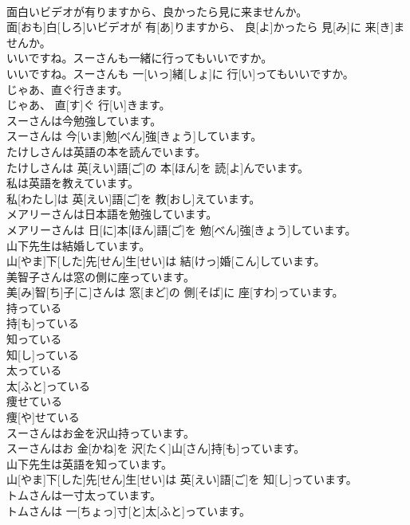 \documentclass[8pt]{extreport}
\begin{document}
\begin{CJK}{UTF8}{min}
\\	面白いビデオが有りますから、良かったら見に来ませんか。	
\\	面[おも]白[しろ]いビデオが 有[あ]りますから、 良[よ]かったら 見[み]に 来[き]ませんか。
\\	いいですね。スーさんも一緒に行ってもいいですか。	
\\	いいですね。スーさんも 一[いっ]緒[しょ]に 行[い]ってもいいですか。
\\	じゃあ、直ぐ行きます。	
\\	じゃあ、 直[す]ぐ 行[い]きます。
\\	スーさんは今勉強しています。	
\\	スーさんは 今[いま]勉[べん]強[きょう]しています。
\\	たけしさんは英語の本を読んでいます。	
\\	たけしさんは 英[えい]語[ご]の 本[ほん]を 読[よ]んでいます。
\\	私は英語を教えています。	
\\	私[わたし]は 英[えい]語[ご]を 教[おし]えています。
\\	メアリーさんは日本語を勉強しています。	
\\	メアリーさんは 日[に]本[ほん]語[ご]を 勉[べん]強[きょう]しています。
\\	山下先生は結婚しています。	
\\	山[やま]下[した]先[せん]生[せい]は 結[けっ]婚[こん]しています。
\\	美智子さんは窓の側に座っています。	
\\	美[み]智[ち]子[こ]さんは 窓[まど]の 側[そば]に 座[すわ]っています。
\\	持っている	
\\	持[も]っている
\\	知っている	
\\	知[し]っている
\\	太っている	
\\	太[ふと]っている
\\	痩せている	
\\	痩[や]せている	
\\	スーさんはお金を沢山持っています。	
\\	スーさんはお 金[かね]を 沢[たく]山[さん]持[も]っています。
\\	山下先生は英語を知っています。	
\\	山[やま]下[した]先[せん]生[せい]は 英[えい]語[ご]を 知[し]っています。
\\	トムさんは一寸太っています。	
\\	トムさんは 一[ちょっ]寸[と]太[ふと]っています。

\end{CJK}
\end{document}
